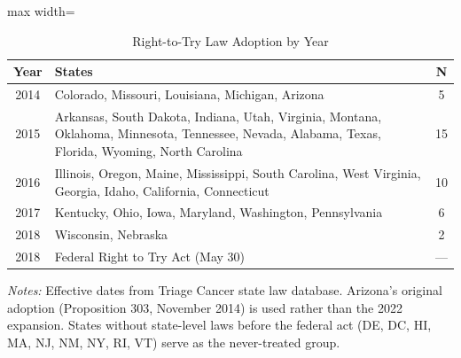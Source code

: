 \begin{table}[htbp]
\centering
\caption{Right-to-Try Law Adoption by Year}
\label{tab:timeline}
\begin{adjustbox}{max width=\textwidth}
\begin{tabular}{clc}
\hline\hline
Year & States & N \\
\hline
2014  &  Colorado, Missouri, Louisiana, Michigan, Arizona  &  5  \\
2015  &  Arkansas, South Dakota, Indiana, Utah, Virginia, Montana, Oklahoma, Minnesota, Tennessee, Nevada, Alabama, Texas, Florida, Wyoming, North Carolina  &  15  \\
2016  &  Illinois, Oregon, Maine, Mississippi, South Carolina, West Virginia, Georgia, Idaho, California, Connecticut  &  10  \\
2017  &  Kentucky, Ohio, Iowa, Maryland, Washington, Pennsylvania  &  6  \\
2018  &  Wisconsin, Nebraska  &  2  \\
\hline
2018 & Federal Right to Try Act (May 30) & --- \\
\hline\hline
\end{tabular}
\end{adjustbox}
\begin{minipage}{0.95\textwidth}
\footnotesize \textit{Notes:} Effective dates from Triage Cancer state law database. Arizona's original adoption (Proposition 303, November 2014) is used rather than the 2022 expansion. States without state-level laws before the federal act (DE, DC, HI, MA, NJ, NM, NY, RI, VT) serve as the never-treated group.
\end{minipage}
\end{table}
